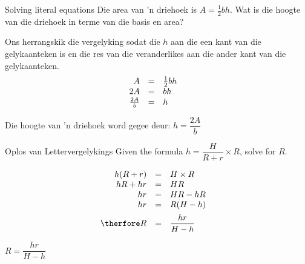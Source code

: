 \begin{wex}
{Solving literal equations}
{
Die area van ’n driehoek is $A=\frac{1}{2}bh$. Wat is die hoogte van die driehoek in terme van die basis en area?
}
{
Ons herrangskik die vergelyking sodat die $h$ aan die een kant
van die gelykaanteken is en die res van die veranderlikes aan die
ander kant van die gelykaanteken.
\begin{equation*}
    \begin{array}{cccc}\hfill A& =& \frac{1}{2}bh\hfill & \\
	\hfill 2A& =& bh\hfill & \hfill \\
	\hfill \frac{2A}{b}& =& h\hfill 
    \end{array}
\end{equation*}

Die hoogte van ’n driehoek word gegee deur: $h=\dfrac{2A}{b}$
} 
\end{wex}

\begin{wex}
{Oplos van Lettervergelykings}
{
Given the formula $h=\dfrac{H}{R+r} \times R$, solve for $R$.
}
{
\begin{equation*}
    \begin{array}{ccll}\hfill h(R+r)& =& H \times R\hfill & \\
	\hfill hR + hr& =& HR\hfill & \hfill \\
	\hfill hr & =& HR - hR\hfill \\
\hfill hr& =& R(H - h)\hfill \vspace{5pt}\\ 
\hfill \therfore R & =& \dfrac{hr}{H-h}\hfill 
    \end{array}
\end{equation*}

$R = \dfrac{hr}{H-h}$
} 
\end{wex}


